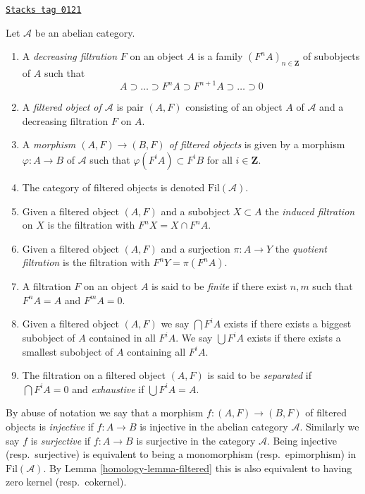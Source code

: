 \begin{definition}[Filtered]
\label{homology-definition-filtered}
\href{https://stacks.math.columbia.edu/tag/0121}{\texttt{Stacks tag 0121}}

Let $\mathcal{A}$ be an abelian category.
\begin{enumerate}
\item A {\it decreasing filtration} $F$ on an object $A$
is a family $(F^nA)_{n \in \mathbf{Z}}$ of subobjects of $A$ such that
$$
A \supset \ldots \supset F^nA \supset F^{n + 1}A \supset \ldots \supset 0
$$
\item A {\it filtered object of $\mathcal{A}$} is
pair $(A, F)$ consisting of an object $A$ of $\mathcal{A}$
and a decreasing filtration $F$ on $A$.
\item A {\it morphism $(A, F) \to (B, F)$ of filtered objects}
is given by a morphism $\varphi : A \to B$ of $\mathcal{A}$
such that $\varphi(F^iA) \subset F^iB$ for all $i \in \mathbf{Z}$.
\item The category of filtered objects is denoted $\text{Fil}(\mathcal{A})$.
\item Given a filtered object $(A, F)$ and a subobject $X \subset A$ the
{\it induced filtration} on $X$ is the filtration with $F^nX = X \cap F^nA$.
\item Given a filtered object $(A, F)$ and a surjection
$\pi : A \to Y$ the {\it quotient filtration} is the filtration with
$F^nY = \pi(F^nA)$.
\item A filtration $F$ on an object $A$ is said to be {\it finite}
if there exist $n, m$ such that $F^nA = A$ and $F^mA = 0$.
\item Given a filtered object $(A, F)$ we say $\bigcap F^iA$ exists
if there exists a biggest subobject of $A$ contained in all $F^iA$.
We say $\bigcup F^iA$ exists if there exists a smallest subobject
of $A$ containing all $F^iA$.
\item The filtration on a filtered object $(A, F)$ is said to be
{\it separated} if $\bigcap F^iA = 0$ and
{\it exhaustive} if $\bigcup F^iA = A$.
\end{enumerate}
\end{definition}

By abuse of notation we say that a morphism $f : (A, F) \to (B, F)$
of filtered objects is {\it injective} if $f : A \to B$ is injective
in the abelian category $\mathcal{A}$. Similarly we say $f$ is
{\it surjective} if $f : A \to B$ is surjective in the category
$\mathcal{A}$. Being injective (resp.\ surjective)
is equivalent to being a monomorphism (resp.\ epimorphism)
in $\text{Fil}(\mathcal{A})$. By
Lemma \ref{homology-lemma-filtered}
this is also equivalent to having zero kernel (resp.\ cokernel).

